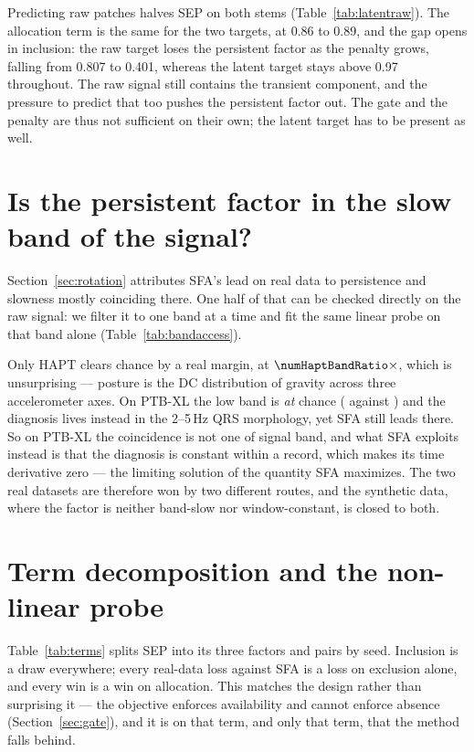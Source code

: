 Predicting raw patches halves SEP on both stems (Table~\ref{tab:latentraw}). The allocation term is the same for the two targets, at 0.86 to 0.89, and the gap opens in inclusion: the raw target loses the persistent factor as the penalty grows, falling from 0.807 to 0.401, whereas the latent target stays above 0.97 throughout. The raw signal still contains the transient component, and the pressure to predict that too pushes the persistent factor out. The gate and the penalty are thus not sufficient on their own; the latent target has to be present as well.

\section{Is the persistent factor in the slow band of the signal?}
\label{app:coincidence}

Section~\ref{sec:rotation} attributes SFA's lead on real data to persistence and slowness
mostly coinciding there. One half of that can be checked directly on the raw signal: we
filter it to one band at a time and fit the same linear probe on that band alone
(Table~\ref{tab:bandaccess}).



Only HAPT clears chance by a real margin, at $\numHaptBandRatio\times$, which is
unsurprising --- posture is the DC distribution of gravity across three accelerometer
axes. On PTB-XL the low band is \emph{at} chance (\numPtbLowBand{} against
\numPtbChance) and the diagnosis lives instead in the 2--5\,Hz QRS morphology, yet SFA
still leads there. So on PTB-XL the coincidence is not one of signal band, and what SFA
exploits instead is that the diagnosis is constant within a record, which makes its time
derivative zero --- the limiting solution of the quantity SFA maximizes. The two real
datasets are therefore won by two different routes, and the synthetic data, where the
factor is neither band-slow nor window-constant, is closed to both.

\section{Term decomposition and the non-linear probe}
\label{app:probe}



Table~\ref{tab:terms} splits SEP into its three factors and pairs by seed. Inclusion is a draw everywhere; every real-data loss against SFA is a loss on exclusion alone, and every win is a win on allocation. This matches the design rather than surprising it --- the objective enforces availability and cannot enforce absence (Section~\ref{sec:gate}), and it is on that term, and only that term, that the method falls behind.

